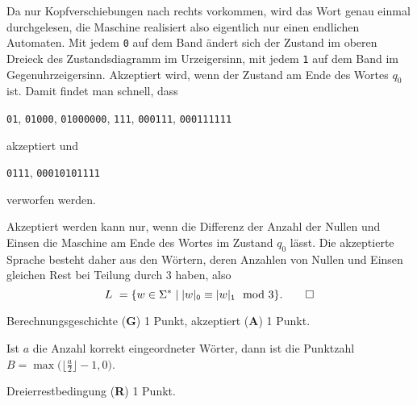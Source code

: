 \begin{loesung}
\begin{teilaufgaben}
\begin{center}
\begin{tabular}{>{$}c<{$}|cccccccc|>{$}l<{$}}
\hline
\end{tabular}
\end{center}
\item
Da nur Kopfverschiebungen nach rechts vorkommen, wird das Wort genau
einmal durchgelesen, die Maschine realisiert also eigentlich nur einen
endlichen Automaten.
Mit jedem \texttt{0} auf dem Band ändert sich der Zustand im oberen
Dreieck des Zustandsdiagramm im Urzeigersinn,
mit jedem \texttt{1} auf dem Band im Gegenuhrzeigersinn.
Akzeptiert wird, wenn der Zustand am Ende des Wortes $q_0$ ist.
Damit findet man schnell, dass
\begin{center}
\texttt{01},
\texttt{01000},
\texttt{01000000},
\texttt{111},
\texttt{000111},
\texttt{000111111}
\end{center}
akzeptiert und
\begin{center}
\texttt{0111},
\texttt{00010101111}
\end{center}
verworfen werden.
\item
Akzeptiert werden kann nur, wenn die Differenz der Anzahl der Nullen und
Einsen die Maschine am Ende des Wortes im Zustand $q_0$ lässt.
Die akzeptierte Sprache besteht daher aus den Wörtern, deren Anzahlen
von Nullen und Einsen gleichen Rest bei Teilung durch 3 haben,
also
\[
L = \{
w\in\Sigma^*
\mid
|w|_{\texttt{0}} \equiv |w|_{\texttt{1}} \mod 3
\}.
\qedhere
\]
\end{teilaufgaben}
\end{loesung}

\begin{bewertung}
\begin{teilaufgaben}
\item 
Berechnungsgeschichte ({\bf G}) 1 Punkt,
akzeptiert ({\bf A}) 1 Punkt.
\item
Ist $a$ die Anzahl korrekt eingeordneter Wörter, dann ist die Punktzahl
$B=\max\bigl(\lfloor \frac{a}2\rfloor-1,0\bigr)$.
\item
Dreierrestbedingung ({\bf R}) 1 Punkt.
\end{teilaufgaben}
\end{bewertung}
